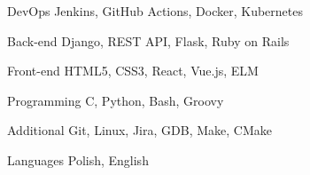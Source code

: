 
\begin{cvskills}

  \cvskill
    {DevOps} %
    {Jenkins, GitHub Actions, Docker, Kubernetes} %

  \cvskill
    {Back-end} %
    {Django, REST API, Flask, Ruby on Rails} %

  \cvskill
    {Front-end} %
    {HTML5, CSS3, React, Vue.js, ELM} %

  \cvskill
    {Programming} %
    {C, Python, Bash, Groovy} %

  \cvskill
    {Additional} %
    {Git, Linux, Jira, GDB, Make, CMake} %

  \cvskill
    {Languages} %
    {Polish, English} %

\end{cvskills}

